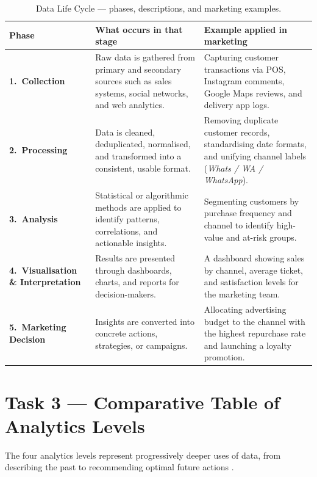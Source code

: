 \documentclass[12pt, a4paper]{article}
\newcommand{\Hcell}[1]{{\color{white}\textbf{#1}}}
\begin{document}
\begin{table}[ht]
\centering
\caption{Data Life Cycle --- phases, descriptions, and marketing examples.}
\label{tab:dlc}
\small
\begin{tabularx}{\textwidth}{>{\bfseries}p{2.8cm} X X}
\toprule
\rowcolor{aqHdr}
\Hcell{Phase} &
\Hcell{What occurs in that stage} &
\Hcell{Example applied in marketing} \\
\midrule
1.\ Collection &
  Raw data is gathered from primary and secondary sources such as sales
  systems, social networks, and web analytics. &
  Capturing customer transactions via POS, Instagram comments, Google Maps
  reviews, and delivery app logs. \\
\rowcolor{aqRow}
2.\ Processing &
  Data is cleaned, deduplicated, normalised, and transformed into a
  consistent, usable format. &
  Removing duplicate customer records, standardising date formats, and unifying
  channel labels (\textit{Whats / WA / WhatsApp}). \\
3.\ Analysis &
  Statistical or algorithmic methods are applied to identify patterns,
  correlations, and actionable insights. &
  Segmenting customers by purchase frequency and channel to identify
  high-value and at-risk groups. \\
\rowcolor{aqRow}
4.\ Visualisation \& Interpretation &
  Results are presented through dashboards, charts, and reports for
  decision-makers. &
  A dashboard showing sales by channel, average ticket, and satisfaction
  levels for the marketing team. \\
5.\ Marketing Decision &
  Insights are converted into concrete actions, strategies, or campaigns. &
  Allocating advertising budget to the channel with the highest repurchase
  rate and launching a loyalty promotion. \\
\bottomrule
\end{tabularx}
\end{table}

\newpage

\section{Task 3 --- Comparative Table of Analytics Levels}

The four analytics levels represent progressively deeper uses of data, from
describing the past to recommending optimal future actions \cite{davenport2007}.
\end{document}
